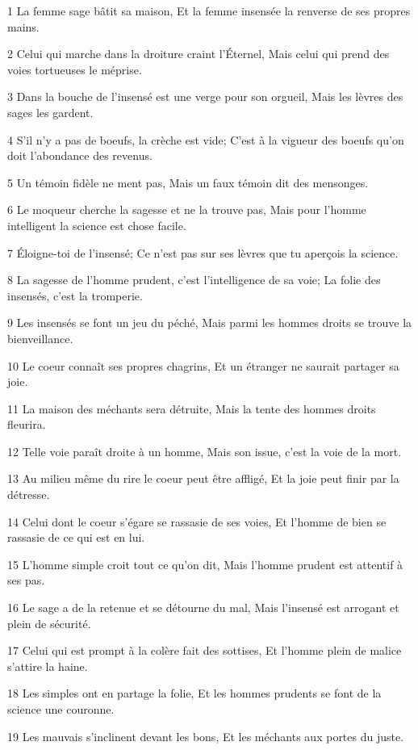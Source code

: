 \par 1 La femme sage bâtit sa maison, Et la femme insensée la renverse de ses propres mains.
\par 2 Celui qui marche dans la droiture craint l'Éternel, Mais celui qui prend des voies tortueuses le méprise.
\par 3 Dans la bouche de l'insensé est une verge pour son orgueil, Mais les lèvres des sages les gardent.
\par 4 S'il n'y a pas de boeufs, la crèche est vide; C'est à la vigueur des boeufs qu'on doit l'abondance des revenus.
\par 5 Un témoin fidèle ne ment pas, Mais un faux témoin dit des mensonges.
\par 6 Le moqueur cherche la sagesse et ne la trouve pas, Mais pour l'homme intelligent la science est chose facile.
\par 7 Éloigne-toi de l'insensé; Ce n'est pas sur ses lèvres que tu aperçois la science.
\par 8 La sagesse de l'homme prudent, c'est l'intelligence de sa voie; La folie des insensés, c'est la tromperie.
\par 9 Les insensés se font un jeu du péché, Mais parmi les hommes droits se trouve la bienveillance.
\par 10 Le coeur connaît ses propres chagrins, Et un étranger ne saurait partager sa joie.
\par 11 La maison des méchants sera détruite, Mais la tente des hommes droits fleurira.
\par 12 Telle voie paraît droite à un homme, Mais son issue, c'est la voie de la mort.
\par 13 Au milieu même du rire le coeur peut être affligé, Et la joie peut finir par la détresse.
\par 14 Celui dont le coeur s'égare se rassasie de ses voies, Et l'homme de bien se rassasie de ce qui est en lui.
\par 15 L'homme simple croit tout ce qu'on dit, Mais l'homme prudent est attentif à ses pas.
\par 16 Le sage a de la retenue et se détourne du mal, Mais l'insensé est arrogant et plein de sécurité.
\par 17 Celui qui est prompt à la colère fait des sottises, Et l'homme plein de malice s'attire la haine.
\par 18 Les simples ont en partage la folie, Et les hommes prudents se font de la science une couronne.
\par 19 Les mauvais s'inclinent devant les bons, Et les méchants aux portes du juste.
